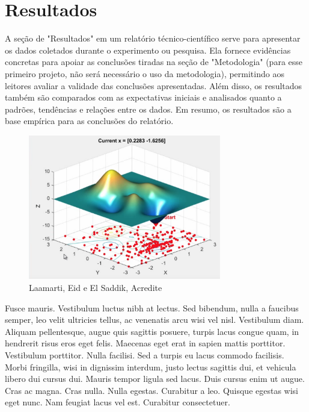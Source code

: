 \section{Resultados}

A seção de "Resultados" em um relatório técnico-científico serve para apresentar os dados coletados durante o experimento ou pesquisa. Ela fornece evidências concretas para apoiar as conclusões tiradas na seção de "Metodologia" (para esse primeiro projeto, não será necessário o uso da metodologia), permitindo aos leitores avaliar a validade das conclusões apresentadas. Além disso, os resultados também são comparados com as expectativas iniciais e analisados quanto a padrões, tendências e relações entre os dados. Em resumo, os resultados são a base empírica para as conclusões do relatório. \\

\begin{figure}[h]
        \centering
        \includegraphics[width=0.75\textwidth]{images/final1.png}
    \caption{Laamarti, Eid e El Saddik, Acredite}
    \label{fig:test}
\end{figure}

Fusce mauris. Vestibulum luctus nibh at lectus. Sed bibendum, nulla a faucibus semper, leo
velit ultricies tellus, ac venenatis arcu wisi vel nisl. Vestibulum diam. Aliquam pellentesque,
augue quis sagittis posuere, turpis lacus congue quam, in hendrerit risus eros eget felis.
Maecenas eget erat in sapien mattis porttitor. Vestibulum porttitor. Nulla facilisi. Sed a
turpis eu lacus commodo facilisis. Morbi fringilla, wisi in dignissim interdum, justo lectus
sagittis dui, et vehicula libero dui cursus dui. Mauris tempor ligula sed lacus. Duis cursus
enim ut augue. Cras ac magna. Cras nulla. Nulla egestas. Curabitur a leo. Quisque egestas
wisi eget nunc. Nam feugiat lacus vel est. Curabitur consectetuer. \\
